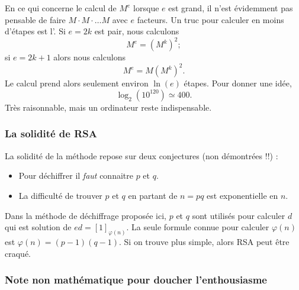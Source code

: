 En ce qui concerne le calcul de \( M^e\) lorsque \( e\) est grand, il n'est évidemment pas pensable de faire \( M\cdot M\cdot\ldots M\) avec \( e\) facteurs. Un truc pour calculer en moins d'étapes est l'. Si \( e=2k\) est pair, nous calculons
\begin{equation}
    M^e=(M^k)^2;
\end{equation}
si \( e=2k+1\) alors nous calculons
\begin{equation}
    M^e=M(M^k)^2.
\end{equation}
Le calcul prend alors seulement environ \( \ln(e)\) étapes. Pour donner une idée,
\begin{equation}
    \log_2(10^{120})\simeq 400.
\end{equation}
Très raisonnable, mais un ordinateur reste indispensable.

\subsubsection{La solidité de RSA}

La solidité de la méthode repose sur deux conjectures (non démontrées !!) :
\begin{itemize}
    \item Pour déchiffrer il \emph{faut} connaitre \( p\) et \( q\). 
    \item La difficulté de trouver \( p\) et \( q\) en partant de \( n=pq\) est exponentielle en \( n\).
\end{itemize}
Dans la méthode de déchiffrage proposée ici, \( p\) et \( q\) sont utilisés pour calculer \( d\) qui est solution de \( ed=[1]_{\varphi(n)}\). La seule formule connue pour calculer \( \varphi(n)\) est \( \varphi(n)=(p-1)(q-1)\). Si on trouve plus simple, alors RSA peut être craqué.

\subsubsection{Note non mathématique pour doucher l'enthousiasme}

